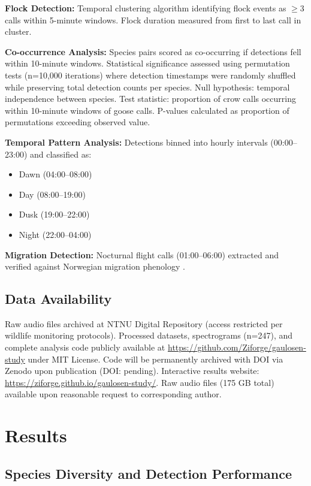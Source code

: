 \documentclass[twocolumn]{article}
\begin{document}
\textbf{Flock Detection:} Temporal clustering algorithm identifying flock events as $\geq$3 calls within 5-minute windows. Flock duration measured from first to last call in cluster.

\textbf{Co-occurrence Analysis:} Species pairs scored as co-occurring if detections fell within 10-minute windows. Statistical significance assessed using permutation tests (n=10,000 iterations) where detection timestamps were randomly shuffled while preserving total detection counts per species. Null hypothesis: temporal independence between species. Test statistic: proportion of crow calls occurring within 10-minute windows of goose calls. P-values calculated as proportion of permutations exceeding observed value.

\textbf{Temporal Pattern Analysis:} Detections binned into hourly intervals (00:00--23:00) and classified as:
\begin{itemize}
\item Dawn (04:00--08:00)
\item Day (08:00--19:00)
\item Dusk (19:00--22:00)
\item Night (22:00--04:00)
\end{itemize}

\textbf{Migration Detection:} Nocturnal flight calls (01:00--06:00) extracted and verified against Norwegian migration phenology \citep{Shimmings2016}.

\subsection{Data Availability}

Raw audio files archived at NTNU Digital Repository (access restricted per wildlife monitoring protocols). Processed datasets, spectrograms (n=247), and complete analysis code publicly available at \url{https://github.com/Ziforge/gaulosen-study} under MIT License. Code will be permanently archived with DOI via Zenodo upon publication (DOI: pending). Interactive results website: \url{https://ziforge.github.io/gaulosen-study/}. Raw audio files (175 GB total) available upon reasonable request to corresponding author.

\section{Results}

\subsection{Species Diversity and Detection Performance}
\end{document}
